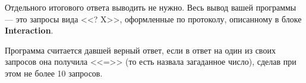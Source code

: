 Отдельного итогового ответа выводить не нужно. Весь вывод вашей программы --- это запросы вида <<? X>>, оформленные по протоколу, описанному в блоке \textbf{Interaction}.

Программа считается давшей верный ответ, если в ответ на один из своих запросов она получила <<=>> (то есть назвала загаданное число), сделав при этом не более 10 запросов.
